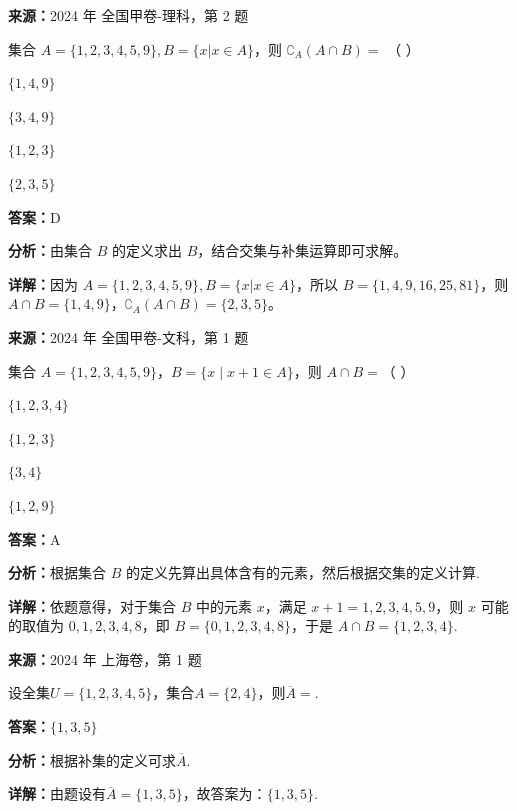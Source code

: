 \begin{question}[points=5]
\textbf{来源：}2024 年 全国甲卷-理科，第 2 题\par
集合 $A=\{1,2,3,4,5,9\},B=\{x|x\in A\}$，则 $\complement_A(A\cap B)=$ （   ）
\begin{choices}
  \item $\{1,4,9\}$
  \item $\{3,4,9\}$
  \item $\{1,2,3\}$
  \item $\{2,3,5\}$
\end{choices}
\begin{solution}
\textbf{答案：}D

\textbf{分析：}由集合 $B$ 的定义求出 $B$，结合交集与补集运算即可求解。

\textbf{详解：}因为 $A=\{1,2,3,4,5,9\},B=\{x|x\in A\}$，所以 $B=\{1,4,9,16,25,81\}$，则 $A\cap B=\{1,4,9\}$，$\complement_A(A\cap B)=\{2,3,5\}$。
\end{solution}
\end{question}

\begin{question}[points=5]
\textbf{来源：}2024 年 全国甲卷-文科，第 1 题\par
集合 $A = \{1, 2, 3, 4, 5, 9\}$，$B = \{x \mid x + 1 \in A\}$，则 $A \cap B =$（ ）
\begin{choices}
  \item $\{1, 2, 3, 4\}$
  \item $\{1, 2, 3\}$
  \item $\{3, 4\}$
  \item $\{1, 2, 9\}$
\end{choices}
\begin{solution}
\textbf{答案：}A

\textbf{分析：}根据集合 $B$ 的定义先算出具体含有的元素，然后根据交集的定义计算.

\textbf{详解：}依题意得，对于集合 $B$ 中的元素 $x$，满足 $x + 1 = 1, 2, 3, 4, 5, 9$，则 $x$ 可能的取值为 $0, 1, 2, 3, 4, 8$，即 $B = \{0, 1, 2, 3, 4, 8\}$，于是 $A \cap B = \{1, 2, 3, 4\}$.
\end{solution}
\end{question}

\begin{question}[points=4]
\textbf{来源：}2024 年 上海卷，第 1 题\par
设全集$U=\{1,2,3,4,5\}$，集合$A=\{2,4\}$，则$\overline{A}=$.
\fillin[{$\{1,3,5\}$}]
\begin{solution}
\textbf{答案：}$\{1,3,5\}$

\textbf{分析：}根据补集的定义可求$\overline{A}$.

\textbf{详解：}由题设有$\overline{A}=\{1,3,5\}$，故答案为：$\{1,3,5\}$.
\end{solution}
\end{question}

